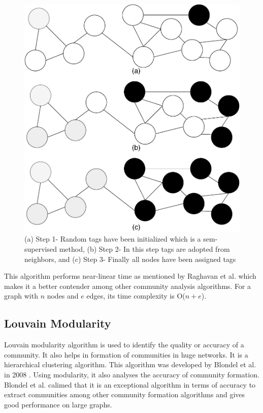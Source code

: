 \documentclass[journal,twoside,web]{ieeecolor}
\begin{document}
\begin{figure}[!h]
    \centerline{\includegraphics[scale=0.35]{figures/label_propagation.pdf}}
    \caption{(a) Step 1- Random tags have been initialized which is a sem-supervised method, (b) Step 2- In this step tags are adopted from neighbors, and (c) Step 3- Finally all nodes have been assigned tags}
    \label{fig6}
\end{figure}

This algorithm performs near-linear time as mentioned by Raghavan et al.\cite{16} which makes it a better contender among other community analysis algorithms. For a graph with $n$ nodes and $e$ edges, its time complexity is O($n + e$).

\subsection{Louvain Modularity}
Louvain modularity algorithm is used to identify the quality or accuracy of a community. It also helps in formation of communities in huge networks. It is a hierarchical clustering algorithm. This algorithm was developed by Blondel et al. in 2008 \cite{20}. Using modularity, it also analyses the accuracy of community formation. Blondel et al. calimed that it is an exceptional algorithm in terms of accuracy to extract communities among other community formation algorithms and gives good performance on large graphs.
\end{document}

